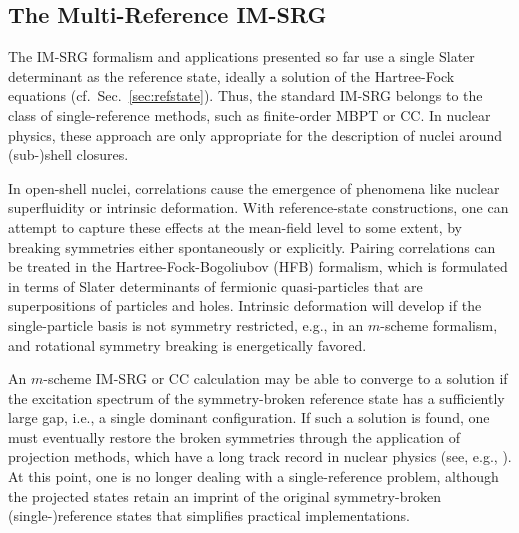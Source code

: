
\subsection{The Multi-Reference IM-SRG}
\label{sec:mrimsrg}

The IM-SRG formalism and applications presented so far use a single
Slater determinant as the reference state, ideally a solution of the
Hartree-Fock equations (cf.~Sec.~\ref{sec:refstate}). Thus, the
standard IM-SRG belongs to the class of single-reference methods, such
as finite-order MBPT or CC. In nuclear physics, these approach are
only appropriate for the description of nuclei around (sub-)shell
closures.

In open-shell nuclei, correlations cause the emergence of phenomena
like nuclear superfluidity or intrinsic deformation. With
reference-state constructions, one can attempt to capture these
effects at the mean-field level to some extent, by breaking symmetries
either spontaneously or explicitly. Pairing correlations can be
treated in the Hartree-Fock-Bogoliubov (HFB) formalism, which is
formulated in terms of Slater determinants of fermionic
quasi-particles that are superpositions of particles and
holes. Intrinsic deformation will develop if the single-particle basis
is not symmetry restricted, e.g., in an $m$-scheme formalism, and
rotational symmetry breaking is energetically favored.

An $m$-scheme IM-SRG or CC calculation may be able to converge to a
solution if the excitation spectrum of the symmetry-broken reference
state has a sufficiently large gap, i.e., a single dominant
configuration. If such a solution is found, one must eventually
restore the broken symmetries through the application of projection
methods, which have a long track record in nuclear physics (see, e.g.,
\cite{Peierls:1973fk,Ring:1980bb,Egido:1982sd,Robledo:1994qf,Flocard:1997fx,Sheikh:2000xx,Dobaczewski:2007hh,Bender:2009rv,Duguet:2009ph,Lacroix:2009aj,Lacroix:2012vn,Duguet:2015ye}). At
this point, one is no longer dealing with a single-reference problem,
although the projected states retain an imprint of the original
symmetry-broken (single-)reference states that simplifies practical
implementations.

